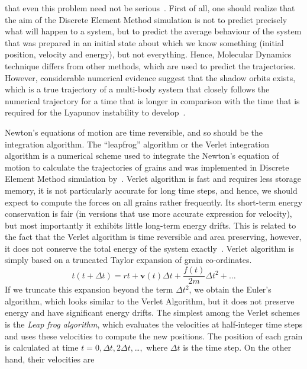 that even this 
problem 
need not be serious~\citep{Daan1996}. First of all, one should realize that 
the aim of the 
Discrete Element Method simulation is not to predict precisely what will 
happen to a system, but 
to 
predict the average behaviour of the system that was prepared in an initial 
state about which we 
know something (initial position, velocity and energy), but not everything. 
Hence, Molecular 
Dynamics technique differs from other methods, which are used to predict the 
trajectories. 
However, 
considerable numerical evidence suggest that the shadow orbits exists, which 
is a true trajectory 
of a multi-body system that closely follows the numerical trajectory for a 
time that is longer in 
comparison with the time that is required for the Lyapunov instability to 
develop~\citep{Daan1996}.

Newton's equations of motion are time reversible, and so should be the 
integration algorithm. The 
``leapfrog'' algorithm or the Verlet integration algorithm is a numerical 
scheme used to integrate 
the Newton's equation of motion to calculate the trajectories of grains and 
was implemented in 
Discrete Element Method simulation by~\citet{Verlet1967}. Verlet algorithm is 
fast and requires 
less 
storage memory, it is not particularly accurate for long time steps, and 
hence, we should expect 
to 
compute the forces on all grains rather frequently. Its short-term energy 
conservation is fair 
(in versions that use more accurate expression for velocity), but most 
importantly it exhibits 
little long-term energy drifts. This is related to the fact that the Verlet 
algorithm is time 
reversible and area preserving, however, it does not conserve the total energy 
of the system 
exactly~\citep{Daan1996}. Verlet algorithm is simply based on a truncated 
Taylor expansion of 
grain co-ordinates. 
\begin{equation}
t(t+\Delta t)=r{t} +\mathbf{v}(t) \Delta t + \frac{f(t)}{2\mathit{m}} \Delta 
t^{2}+ \dots
\end{equation}
If we truncate this expansion beyond the term $\Delta t^{2}$, we obtain the 
Euler's algorithm, 
which looks similar to the Verlet Algorithm, but it does not preserve energy 
and have significant 
energy drifts. The simplest among the Verlet schemes is the \textit{Leap frog 
algorithm}, which 
evaluates the velocities at half-integer time steps and uses these velocities 
to compute the new 
positions. The position of each grain is calculated at time $t=0, \Delta t, 
2\Delta t, $\dots$ ,$ 
where $\Delta t$ is the time step. On the other hand, their velocities are 
